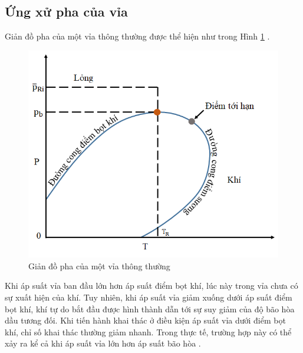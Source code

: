 \documentclass[12pt,a4paper]{report}
\begin{document}
\subsection{Ứng xử pha của vỉa}
Giản đồ pha của một vỉa thông thường được thể hiện như trong Hình \ref{fig:phase_behavior_in_pi} \cite{ahmed2006reservoir}.
	\begin{figure}[h]
		\centering
		\includegraphics[scale=0.8]{Fig/phase_behavior_in_pi.png}
		\caption{Giản đồ pha của một vỉa thông thường}
		\label{fig:phase_behavior_in_pi}
	\end{figure}
\newline
Khi áp suất vỉa ban đầu lớn hơn áp suất điểm bọt khí, lúc này trong vỉa chưa có sự xuất hiện của khí. Tuy nhiên, khi áp suất vỉa giảm xuống dưới áp suất điểm bọt khí, khí tự do bắt đầu được hình thành dẫn tới sự suy giảm của độ bão hòa dầu tương đối. Khi tiến hành khai thác ở điều kiện áp suất vỉa dưới điểm bọt khí, chỉ số khai thác thường giảm nhanh. Trong thực tế, trường hợp này có thể xảy ra kể cả khi áp suất vỉa lớn hơn áp suất bão hòa \cite{standing1951volumetric}.\\
\end{document}
